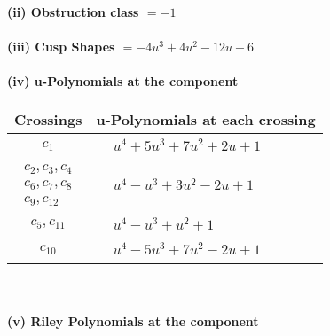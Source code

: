 \documentclass[1p]{elsarticle_modified}
\theoremstyle{definition}
\begin{document}
\flushleft \textbf{(ii) Obstruction class $= -1$}\\~\\
\flushleft \textbf{(iii) Cusp Shapes $= -4 u^3+4 u^2-12 u+6$}\\~\\
\newpage\renewcommand{\arraystretch}{1}
\flushleft \textbf{(iv) u-Polynomials at the component}\newline \\
\begin{tabular}{m{50pt}|m{274pt}}
Crossings & \hspace{64pt}u-Polynomials at each crossing \\
\hline $$\begin{aligned}c_{1}\end{aligned}$$&$\begin{aligned}
&u^4+5 u^3+7 u^2+2 u+1
\end{aligned}$\\
\hline $$\begin{aligned}c_{2},c_{3},c_{4}\\c_{6},c_{7},c_{8}\\c_{9},c_{12}\end{aligned}$$&$\begin{aligned}
&u^4- u^3+3 u^2-2 u+1
\end{aligned}$\\
\hline $$\begin{aligned}c_{5},c_{11}\end{aligned}$$&$\begin{aligned}
&u^4- u^3+u^2+1
\end{aligned}$\\
\hline $$\begin{aligned}c_{10}\end{aligned}$$&$\begin{aligned}
&u^4-5 u^3+7 u^2-2 u+1
\end{aligned}$\\
\hline
\end{tabular}\\~\\
\newpage\renewcommand{\arraystretch}{1}
\flushleft \textbf{(v) Riley Polynomials at the component}\newline \\
\end{document}
